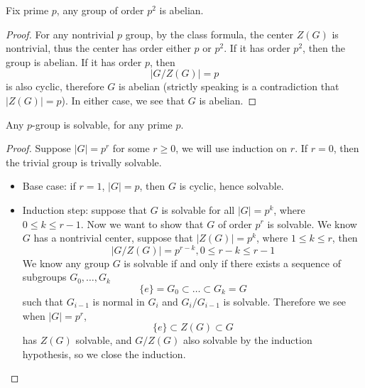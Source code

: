 \begin{lem}[$p^2$ abelian]
    Fix prime $p$, any group of order $p^2$ is abelian. 
\end{lem}
\begin{proof}
    For any nontrivial $p$ group, by the class formula, the center $Z(G)$ is nontrivial, thus the center has order either $p$ or $p^2$. If it has order $p^2$, then the group is abelian. If it has order $p$, then 
    \begin{equation*}
        \left|G/Z(G)\right|=p
    \end{equation*}
    is also cyclic, therefore $G$ is abelian (strictly speaking is a contradiction that $|Z(G)|=p$). In either case, we see that $G$ is abelian.
\end{proof}

\begin{prob}
    Any $p$-group is solvable, for any prime $p$. 
\end{prob}
\begin{proof}
    Suppose $|G|=p^r$ for some $r\geq 0$, we will use induction on $r$. If $r=0$, then the trivial group is trivally solvable. 
    \begin{itemize}
        \item Base case: if $r=1$, $|G|=p$, then $G$ is cyclic, hence solvable. 
        \item Induction step: suppose that $G$ is solvable for all $|G|=p^k$, where $0\leq k\leq r-1$. Now we want to show that $G$ of order $p^r$ is solvable. We know $G$ has a nontrivial center, suppose that $|Z(G)|=p^k$, where $1\leq k\leq r$, then 
        \begin{equation*}
            |G/Z(G)|=p^{r-k}, 0\leq r-k\leq r-1 
        \end{equation*}
        We know any group $G$ is solvable if and only if there exists a sequence of subgroups $G_0,\dots,G_k$
        \begin{equation*}
            \{e\}=G_0\subset\dots\subset G_k=G
        \end{equation*}
        such that $G_{i-1}$ is normal in $G_i$ and $G_i/G_{i-1}$ is solvable. Therefore we see when $|G|=p^{r}$, 
        \begin{equation*}
            \{e\}\subset Z(G)\subset G
        \end{equation*}
        has $Z(G)$ solvable, and $G/Z(G)$ also solvable by the induction hypothesis, so we close the induction. 
    \end{itemize}
    

\end{proof}

